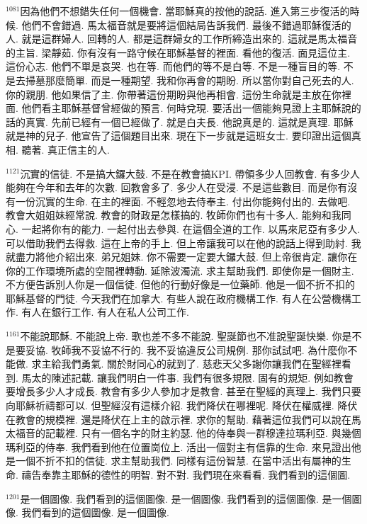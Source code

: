 \documentclass{book}
\begin{document}
$^{1081}$因為他們不想錯失任何一個機會.
當耶穌真的按他的說話.
進入第三步復活的時候.
他們不會錯過.
馬太福音就是要將這個結局告訴我們.
最後不錯過耶穌復活的人.
就是這群婦人.
回轉的人.
都是這群婦女的工作所締造出來的.
這就是馬太福音的主旨.
梁靜茹.
你有沒有一路守候在耶穌基督的裡面.
看他的復活.
面見這位主.
這份心志.
他們不單是哀哭.
也在等.
而他們的等不是白等.
不是一種盲目的等.
不是去掃墓那麼簡單.
而是一種期望.
我和你再會的期盼.
所以當你對自己死去的人.
你的親朋.
他如果信了主.
你帶著這份期盼與他再相會.
這份生命就是主放在你裡面.
他們看主耶穌基督曾經做的預言.
何時兌現.
要活出一個能夠見證上主耶穌說的話的真實.
先前已經有一個已經做了.
就是白夫長.
他說真是的.
這就是真理.
耶穌就是神的兒子.
他宣告了這個題目出來.
現在下一步就是這班女士.
要印證出這個真相.
聽著.
真正信主的人.

$^{1121}$沉實的信徒.
不是搞大鑼大鼓.
不是在教會搞KPI.
帶領多少人回教會.
有多少人能夠在今年和去年的次數.
回教會多了.
多少人在受浸.
不是這些數目.
而是你有沒有一份沉實的生命.
在主的裡面.
不輕忽地去侍奉主.
付出你能夠付出的.
去做吧.
教會大姐姐妹經常說.
教會的財政是怎樣搞的.
牧師你們也有十多人.
能夠和我同心.
一起將你有的能力.
一起付出去參與.
在這個全道的工作.
以馬來尼亞有多少人.
可以借助我們去得救.
這在上帝的手上.
但上帝讓我可以在他的說話上得到助紂.
我就盡力將他介紹出來.
弟兄姐妹.
你不需要一定要大鑼大鼓.
但上帝很肯定.
讓你在你的工作環境所處的空間裡轉動.
延除波濁流.
求主幫助我們.
即使你是一個財主.
不方便告訴別人你是一個信徒.
但他的行動好像是一位藥師.
他是一個不折不扣的耶穌基督的門徒.
今天我們在加拿大.
有些人說在政府機構工作.
有人在公營機構工作.
有人在銀行工作.
有人在私人公司工作.

$^{1161}$不能說耶穌.
不能說上帝.
歌也差不多不能說.
聖誕節也不准說聖誕快樂.
你是不是要妥協.
牧師我不妥協不行的.
我不妥協違反公司規例.
那你試試吧.
為什麼你不能做.
求主給我們勇氣.
關於財同心的就到了.
慈悲天父多謝你讓我們在聖經裡看到.
馬太的陳述記載.
讓我們明白一件事.
我們有很多規限.
固有的規矩.
例如教會要增長多少人才成長.
教會有多少人參加才是教會.
甚至在聖經的真理上.
我們只要向耶穌祈禱都可以.
但聖經沒有這樣介紹.
我們降伏在哪裡呢.
降伏在權威裡.
降伏在教會的規模裡.
還是降伏在上主的啟示裡.
求你的幫助.
藉著這位我們可以說在馬太福音的記載裡.
只有一個名字的財主約瑟.
他的侍奉與一群穆達拉瑪利亞.
與幾個瑪利亞的侍奉.
我們看到他在位置崗位上.
活出一個對主有信靠的生命.
來見證出他是一個不折不扣的信徒.
求主幫助我們.
同樣有這份智慧.
在當中活出有屬神的生命.
禱告奉靠主耶穌的德性的明智.
對不對.
我們現在來看看.
我們看到的這個圖.

$^{1201}$是一個圖像.
我們看到的這個圖像.
是一個圖像.
我們看到的這個圖像.
是一個圖像.
我們看到的這個圖像.
是一個圖像.
\newpage
\end{document}
